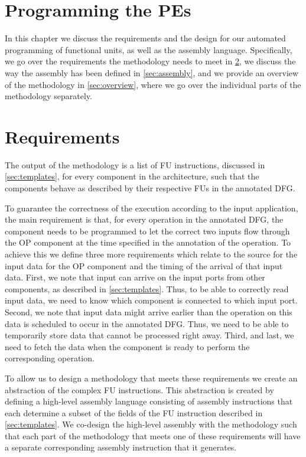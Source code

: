 \section{Programming the PEs}
\label{chap:design}
In this chapter we discuss the requirements and the design for our automated programming of functional units, as well as the assembly language. Specifically, we go over the requirements the methodology needs to meet in \ref{sec:requirements}, we discuss the way the assembly has been defined in \ref{sec:assembly}, and we provide an overview of the methodology in \ref{sec:overview}, where we go over the individual parts of the methodology separately. %

\section{Requirements}
\label{sec:requirements}
The output of the methodology is a list of FU instructions, discussed in \ref{sec:templates}, for every component in the architecture, such that the components behave as described by their respective FUs in the annotated DFG.

To guarantee the correctness of the execution according to the input application, the main requirement is that, for every operation in the annotated DFG, the component needs to be programmed to let the correct two inputs flow through the OP component at the time specified in the annotation of the operation.
To achieve this we define three more requirements which relate to the source for the input data for the OP component and the timing of the arrival of that input data.
First, we note that input can arrive on the input ports from other components, as described in \ref{sec:templates}. Thus, to be able to correctly read input data, we need to know which component is connected to which input port.
Second, we note that input data might arrive earlier than the operation on this data is scheduled to occur in the annotated DFG. Thus, we need to be able to temporarily store data that cannot be processed right away.
Third, and last, we need to fetch the data when the component is ready to perform the corresponding operation.

To allow us to design a methodology that meets these requirements we create an abstraction of the complex FU instructions. This abstraction is created by defining a high-level assembly language consisting of assembly instructions that each determine a subset of the fields of the FU instruction described in \ref{sec:templates}. We co-design the high-level assembly with the methodology such that each part of the methodology that meets one of these requirements will have a separate corresponding assembly instruction that it generates.

